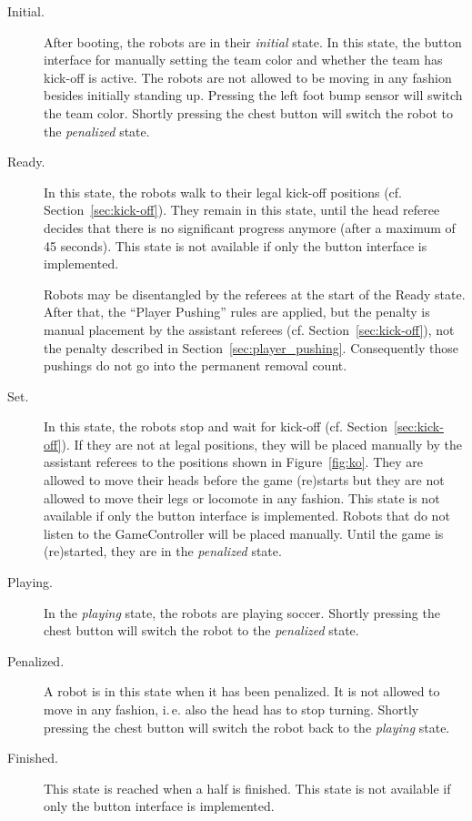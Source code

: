 \documentclass[12pt]{article}
\newcommand{\ie}{\mbox{i.\,e.}\xspace}
\newcommand{\cf}{\mbox{cf.}\xspace}
\newcommand{\KickOffAutoTime}{45 seconds\xspace}
\begin{document}
\begin{description}

\item[Initial.] After booting, the robots are in their \emph{initial} state. In this state, the button interface for manually setting the team color and whether the team has kick-off is active. The robots are not allowed to be moving in any fashion besides initially standing up. Pressing the left foot bump sensor will switch the team color. Shortly pressing the chest button will switch the robot to the \emph{penalized} state.

\item[Ready.] In this state, the robots walk to their legal kick-off positions (\cf Section~\ref{sec:kick-off}). They remain in this state, until the head referee decides that there is no significant progress anymore (after a maximum of \KickOffAutoTime). This state is not available if only the button interface is implemented.

Robots may be disentangled by the referees at the start of the Ready state. After that, 
the ``Player Pushing'' rules are applied, but the penalty is manual placement by the assistant referees (\cf Section~\ref{sec:kick-off}), not the penalty described in Section~\ref{sec:player_pushing}.
Consequently those pushings do not go into the permanent removal count.

\item[Set.] In this state, the robots stop and wait for kick-off (\cf Section~\ref{sec:kick-off}). If they are not at legal positions, they will be placed manually by the assistant referees to the positions shown in Figure~\ref{fig:ko}. They are allowed to move their heads before the game (re)starts but they are not allowed to move their legs or locomote in any fashion. This state is not available if only the button interface is implemented. Robots that do not listen to the GameController will be placed manually. Until the game is (re)started, they are in the \emph{penalized} state.

\item[Playing.] In the \emph{playing} state, the robots are playing soccer. Shortly pressing the chest button will switch the robot to the \emph{penalized} state.

\item[Penalized.] A robot is in this state when it has been penalized. It is not allowed to move in any fashion, \ie also the head has to stop turning. Shortly pressing the chest button will switch the robot back to the \emph{playing} state.

\item[Finished.] This state is reached when a half is finished. This state is not available if only the button interface is implemented.

\end{description}
\end{document}
